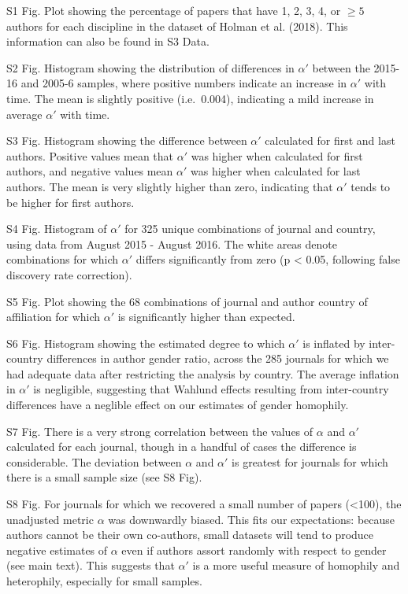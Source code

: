 \documentclass[12pt,]{article}
\begin{document}
S1 Fig. Plot showing the percentage of papers that have 1, 2, 3, 4, or
\({\ge}5\) authors for each discipline in the dataset of Holman et al.
(2018). This information can also be found in S3 Data.

S2 Fig. Histogram showing the distribution of differences in \(\alpha'\)
between the 2015-16 and 2005-6 samples, where positive numbers indicate
an increase in \(\alpha'\) with time. The mean is slightly positive
(i.e.~0.004), indicating a mild increase in average \(\alpha'\) with
time.

S3 Fig. Histogram showing the difference between \(\alpha'\) calculated
for first and last authors. Positive values mean that \(\alpha'\) was
higher when calculated for first authors, and negative values mean
\(\alpha'\) was higher when calculated for last authors. The mean is
very slightly higher than zero, indicating that \(\alpha'\) tends to be
higher for first authors.

S4 Fig. Histogram of \(\alpha'\) for 325 unique combinations of journal
and country, using data from August 2015 - August 2016. The white areas
denote combinations for which \(\alpha'\) differs significantly from
zero (p \textless{} 0.05, following false discovery rate correction).

S5 Fig. Plot showing the 68 combinations of journal and author country
of affiliation for which \(\alpha'\) is significantly higher than
expected.

S6 Fig. Histogram showing the estimated degree to which \(\alpha'\) is
inflated by inter-country differences in author gender ratio, across the
285 journals for which we had adequate data after restricting the
analysis by country. The average inflation in \(\alpha'\) is negligible,
suggesting that Wahlund effects resulting from inter-country differences
have a neglible effect on our estimates of gender homophily.

S7 Fig. There is a very strong correlation between the values of
\(\alpha\) and \(\alpha'\) calculated for each journal, though in a
handful of cases the difference is considerable. The deviation between
\(\alpha\) and \(\alpha'\) is greatest for journals for which there is a
small sample size (see S8 Fig).

S8 Fig. For journals for which we recovered a small number of papers
(\textless{}100), the unadjusted metric \(\alpha\) was downwardly
biased. This fits our expectations: because authors cannot be their own
co-authors, small datasets will tend to produce negative estimates of
\(\alpha\) even if authors assort randomly with respect to gender (see
main text). This suggests that \(\alpha'\) is a more useful measure of
homophily and heterophily, especially for small samples.
\end{document}
